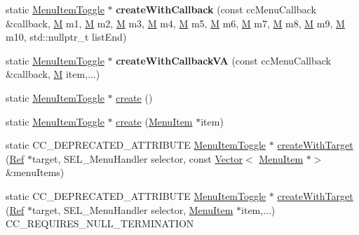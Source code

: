 \begin{DoxyCompactItemize}
\item 
\mbox{\label{classMenuItemToggle_a92d01b35c629e9e75111a67087d95187}} 
static \hyperlink{classMenuItemToggle}{Menu\+Item\+Toggle} $\ast$ {\bfseries create\+With\+Callback} (const cc\+Menu\+Callback \&callback, \hyperlink{classMenuItemToggle_a4f44d80e256ed59e1994b4a04f009903}{M} m1, \hyperlink{classMenuItemToggle_a4f44d80e256ed59e1994b4a04f009903}{M} m2, \hyperlink{classMenuItemToggle_a4f44d80e256ed59e1994b4a04f009903}{M} m3, \hyperlink{classMenuItemToggle_a4f44d80e256ed59e1994b4a04f009903}{M} m4, \hyperlink{classMenuItemToggle_a4f44d80e256ed59e1994b4a04f009903}{M} m5, \hyperlink{classMenuItemToggle_a4f44d80e256ed59e1994b4a04f009903}{M} m6, \hyperlink{classMenuItemToggle_a4f44d80e256ed59e1994b4a04f009903}{M} m7, \hyperlink{classMenuItemToggle_a4f44d80e256ed59e1994b4a04f009903}{M} m8, \hyperlink{classMenuItemToggle_a4f44d80e256ed59e1994b4a04f009903}{M} m9, \hyperlink{classMenuItemToggle_a4f44d80e256ed59e1994b4a04f009903}{M} m10, std\+::nullptr\+\_\+t list\+End)
\item 
\mbox{\label{classMenuItemToggle_a96e810cd124299a808705eb62d85ed02}} 
static \hyperlink{classMenuItemToggle}{Menu\+Item\+Toggle} $\ast$ {\bfseries create\+With\+Callback\+VA} (const cc\+Menu\+Callback \&callback, \hyperlink{classMenuItemToggle_a4f44d80e256ed59e1994b4a04f009903}{M} item,...)
\item 
static \hyperlink{classMenuItemToggle}{Menu\+Item\+Toggle} $\ast$ \hyperlink{classMenuItemToggle_a79e7e5d6269c9677096ed9de182c6197}{create} ()
\item 
static \hyperlink{classMenuItemToggle}{Menu\+Item\+Toggle} $\ast$ \hyperlink{classMenuItemToggle_abd8d4fa7257d61bb2ef7fe9d6f476760}{create} (\hyperlink{classMenuItem}{Menu\+Item} $\ast$item)
\item 
static C\+C\+\_\+\+D\+E\+P\+R\+E\+C\+A\+T\+E\+D\+\_\+\+A\+T\+T\+R\+I\+B\+U\+TE \hyperlink{classMenuItemToggle}{Menu\+Item\+Toggle} $\ast$ \hyperlink{classMenuItemToggle_a6743d3601d35f76a429e5722ad18e352}{create\+With\+Target} (\hyperlink{classRef}{Ref} $\ast$target, S\+E\+L\+\_\+\+Menu\+Handler selector, const \hyperlink{classVector}{Vector}$<$ \hyperlink{classMenuItem}{Menu\+Item} $\ast$$>$ \&menu\+Items)
\item 
static C\+C\+\_\+\+D\+E\+P\+R\+E\+C\+A\+T\+E\+D\+\_\+\+A\+T\+T\+R\+I\+B\+U\+TE \hyperlink{classMenuItemToggle}{Menu\+Item\+Toggle} $\ast$ \hyperlink{classMenuItemToggle_ab02a4ece8d4da96c01c0164768a31d09}{create\+With\+Target} (\hyperlink{classRef}{Ref} $\ast$target, S\+E\+L\+\_\+\+Menu\+Handler selector, \hyperlink{classMenuItem}{Menu\+Item} $\ast$item,...) C\+C\+\_\+\+R\+E\+Q\+U\+I\+R\+E\+S\+\_\+\+N\+U\+L\+L\+\_\+\+T\+E\+R\+M\+I\+N\+A\+T\+I\+ON
$$
\end{DoxyCompactItemize}
